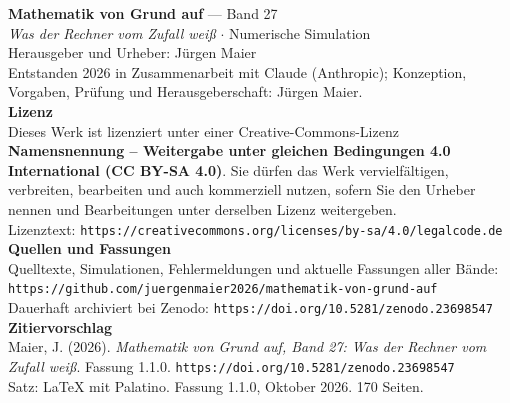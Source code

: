 \thispagestyle{empty}
\vspace*{\fill}
\begin{flushleft}
{\small\color{grau}
\textbf{\color{tief}Mathematik von Grund auf} --- Band 27\\[2pt]
\textit{Was der Rechner vom Zufall weiß} $\cdot$ Numerische Simulation\\[14pt]

Herausgeber und Urheber: Jürgen Maier\\[2pt]
Entstanden 2026 in Zusammenarbeit mit Claude (Anthropic); Konzeption, Vorgaben, Prüfung und Herausgeberschaft: Jürgen Maier.\\[14pt]

\textbf{Lizenz}\\[2pt]
Dieses Werk ist lizenziert unter einer Creative-Commons-Lizenz \textbf{Namensnennung -- Weitergabe unter gleichen Bedingungen 4.0 International (CC BY-SA 4.0)}. Sie dürfen das Werk vervielfältigen, verbreiten, bearbeiten und auch kommerziell nutzen, sofern Sie den Urheber nennen und Bearbeitungen unter derselben Lizenz weitergeben.\\[2pt]
Lizenztext: \texttt{https://creativecommons.org/licenses/by-sa/4.0/legalcode.de}\\[14pt]

\textbf{Quellen und Fassungen}\\[2pt]
Quelltexte, Simulationen, Fehlermeldungen und aktuelle Fassungen aller Bände:\\
\texttt{https://github.com/juergenmaier2026/mathematik-von-grund-auf}\\[2pt]
Dauerhaft archiviert bei Zenodo: \texttt{https://doi.org/10.5281/zenodo.23698547}\\[14pt]

\textbf{Zitiervorschlag}\\[2pt]
Maier, J. (2026). \textit{Mathematik von Grund auf, Band 27: Was der Rechner vom Zufall weiß}. Fassung 1.1.0. \texttt{https://doi.org/10.5281/zenodo.23698547}\\[14pt]

Satz: \LaTeX{} mit Palatino. Fassung 1.1.0, Oktober 2026. 170 Seiten.
}
\end{flushleft}
\vspace*{1.5cm}
